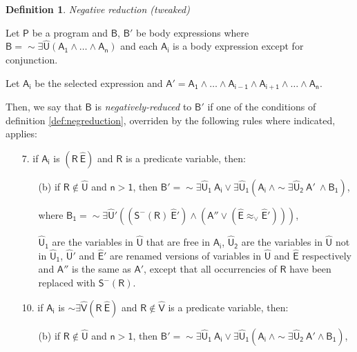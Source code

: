 \documentclass[inscr,ack,preface]{dithesis}
\theoremstyle{definition}
\newtheorem{definition}{Definition}[]
\newcommand{\msf}[1]{$\mathsf{#1}$}
\begin{document}
\begin{definition}{\emph{Negative reduction (tweaked)}}
\label{def:negreduction_new}

Let \msf{P} be a program and \msf{B}, \msf{B'} be body expressions where \msf{B = \sim \exists \widehat{U} \left( A_1 \land \dots \land A_n \right)} and each \msf{A_i} is a body expression except for conjunction.

Let \msf{A_i} be the selected expression and \msf{A' = A_1 \land \dots \land A_{i-1} \land A_{i+1} \land \dots \land A_n}.

Then, we say that \msf{B} is \emph{negatively-reduced} to \msf{B'} if one of the conditions of definition \ref{def:negreduction}, overriden by the following rules where indicated, applies:

\begin{enumerate}
  \item[7.] if \msf{A_i} is \msf{\left( R ~ \widehat{E} \right)} and \msf{R} is a predicate variable, then:
        \begin{enumerate}
          \item[(b)] if \msf{R \not \in \widehat{U}} and \msf{n > 1}, then
                \msf{B' = \sim \exists \widehat{U}_1 ~ A_i \lor \exists \widehat{U}_1 \left( A_i ~\land \sim \exists \widehat{U}_2 ~ A' ~\land B_{1} \right)},

                where \msf{B_{1} = \sim\exists \widehat{U}' \left( \left( S^{-}\left( R \right) ~\widehat{E}' \right) \land \left( A'' \lor \left( \widehat{E} \approx_{\lor} \widehat{E}' \right) \right) \right)},

                \msf{\widehat{U}_1} are the variables in \msf{\widehat{U}} that are free in \msf{A_i}, \msf{\widehat{U}_2} are the variables in \msf{\widehat{U}} not in \msf{\widehat{U}_1}, \msf{\widehat{U}'} and \msf{\widehat{E}'} are renamed versions of variables in \msf{\widehat{U}} and \msf{\widehat{E}} respectively and \msf{A''} is the same as \msf{A'}, except that all occurrencies of \msf{R} have been replaced with \msf{S^{-}(R)}.
        \end{enumerate}
  \item[10.] if \msf{A_i} is \msf{\sim \exists \widehat{V} \left( R ~ \widehat{E} \right)} and \msf{R \not\in \widehat{V}} is a predicate variable,
        then:
        \begin{enumerate}
          \item[(b)] if \msf{R \not\in \widehat{U}} and \msf{n > 1},
                then \msf{B' = \sim \exists \widehat{U}_1 ~ A_i \lor \exists \widehat{U}_1 \left( A_i ~ \land \sim \exists \widehat{U}_2 ~ A' \land B_{1} \right)},


\end{enumerate}
\end{enumerate}
\end{definition}
\end{document}
